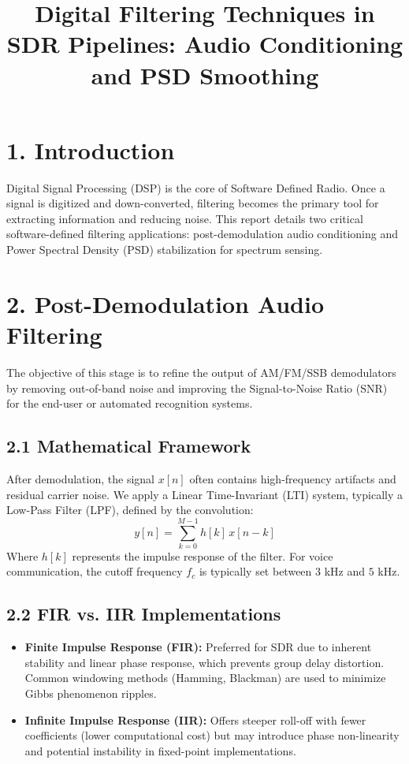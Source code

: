\documentclass[11pt]{report}
\title{Digital Filtering Techniques in SDR Pipelines: Audio Conditioning and PSD Smoothing}
\author{}
\date{}
\begin{document}
\maketitle

\section*{1. Introduction}
Digital Signal Processing (DSP) is the core of Software Defined Radio. Once a signal is digitized and down-converted, filtering becomes the primary tool for extracting information and reducing noise. This report details two critical software-defined filtering applications: post-demodulation audio conditioning and Power Spectral Density (PSD) stabilization for spectrum sensing.

\section*{2. Post-Demodulation Audio Filtering}
The objective of this stage is to refine the output of AM/FM/SSB demodulators by removing out-of-band noise and improving the Signal-to-Noise Ratio (SNR) for the end-user or automated recognition systems.

\subsection*{2.1 Mathematical Framework}
After demodulation, the signal $x[n]$ often contains high-frequency artifacts and residual carrier noise. We apply a Linear Time-Invariant (LTI) system, typically a Low-Pass Filter (LPF), defined by the convolution:
\[
y[n] = \sum_{k=0}^{M-1} h[k] \, x[n-k]
\]
Where $h[k]$ represents the impulse response of the filter. For voice communication, the cutoff frequency $f_c$ is typically set between $3$ kHz and $5$ kHz.

\subsection*{2.2 FIR vs. IIR Implementations}
\begin{itemize}[leftmargin=*]
    \item \textbf{Finite Impulse Response (FIR):} Preferred for SDR due to inherent stability and linear phase response, which prevents group delay distortion. Common windowing methods (Hamming, Blackman) are used to minimize Gibbs phenomenon ripples.
    \item \textbf{Infinite Impulse Response (IIR):} Offers steeper roll-off with fewer coefficients (lower computational cost) but may introduce phase non-linearity and potential instability in fixed-point implementations.
\end{itemize}
\end{document}
